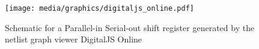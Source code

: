 
\begin{figure}[t]
    \centering
    \texttt{[image: media/graphics/digitaljs\_online.pdf]}
    \caption{Schematic for a Parallel-in Serial-out shift register generated by the netlist graph viewer DigitalJS Online \cite{DigitalJSOnline}}
    \label{fig:digitaljs_online}
\end{figure}
